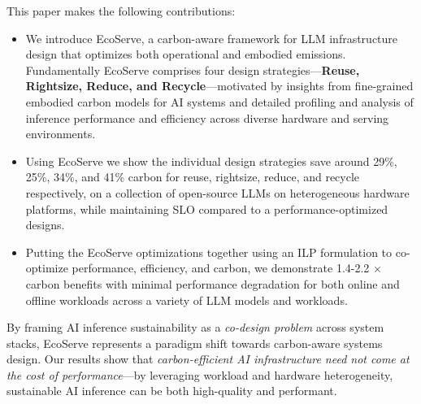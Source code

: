 This paper makes the following contributions:
\begin{itemize} [leftmargin=*]
\item We introduce EcoServe, a carbon-aware framework for LLM infrastructure design that optimizes both operational and embodied emissions. Fundamentally EcoServe comprises four design strategies---\textbf{Reuse, Rightsize, Reduce, and Recycle}---motivated by insights from fine-grained embodied carbon models for AI systems and detailed profiling and analysis of inference performance and efficiency across diverse hardware and serving environments.
\item Using EcoServe we show the individual design strategies save around 29\%, 25\%, 34\%, and 41\% carbon for reuse, rightsize, reduce, and recycle respectively, on a collection of open-source LLMs on heterogeneous hardware platforms, while maintaining SLO compared to a performance-optimized designs.
\item Putting the EcoServe optimizations together using an ILP formulation to co-optimize performance, efficiency, and carbon, we demonstrate 1.4-2.2 $\times$ carbon benefits with minimal performance degradation for both online and offline workloads across a variety of LLM models and workloads.
\end{itemize}

By framing AI inference sustainability as a \textit{co-design problem} across system stacks, EcoServe represents a paradigm shift towards carbon-aware systems design. Our results show that \textit{carbon-efficient AI infrastructure need not come at the cost of performance}—by leveraging workload and hardware heterogeneity, sustainable AI inference can be both high-quality and performant.
